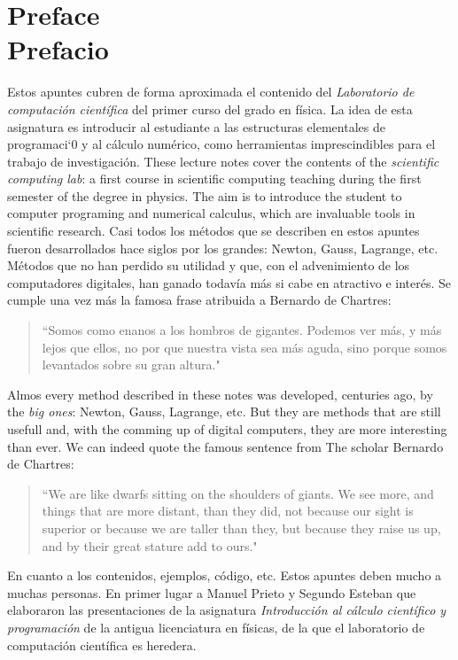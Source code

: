 \chapter*{Preface\\ Prefacio}
\begin{paracol}{2}
Estos apuntes cubren de forma aproximada  el contenido del \emph{Laboratorio de computación científica} del primer curso del grado en física.
La idea de esta asignatura es  introducir al estudiante a las estructuras elementales de programaci`0 y al cálculo numérico, como herramientas imprescindibles para el trabajo de investigación.
\switchcolumn
These lecture notes cover the contents  of the \emph{scientific computing lab}: a first course in scientific computing teaching during the first semester of the degree in physics. The aim is to introduce the student to computer programing and numerical calculus, which are invaluable tools in scientific research.
\switchcolumn         
Casi todos los métodos que se describen en estos apuntes fueron desarrollados hace siglos por los grandes: Newton, Gauss, Lagrange, etc.  Métodos que no han perdido su utilidad y que, con el advenimiento de los computadores digitales, han ganado todavía más si cabe en atractivo e interés. Se cumple una vez más la famosa frase atribuida a Bernardo de Chartres:
\begin{quote}
``Somos como enanos a los hombros de gigantes. Podemos ver más, y más lejos que ellos, no por que nuestra vista sea más aguda, sino porque somos levantados sobre su gran altura."
\end{quote}
\switchcolumn
Almos every method described in these notes was developed, centuries ago, by the \emph{big ones}: Newton, Gauss, Lagrange, etc. But they are methods that are still usefull and, with the comming up of digital computers, they are more interesting than ever. We can indeed quote the famous sentence from The scholar Bernardo de Chartres:
\begin{quote}
``We are like dwarfs sitting on the shoulders of giants. We see more, and things that are more distant, than they did, not because our sight is superior or because we are taller than they, but because they raise us up, and by their great stature add to ours."
\end{quote}          

\switchcolumn
En cuanto a los contenidos, ejemplos, código, etc. Estos apuntes deben mucho a muchas personas. En primer lugar a Manuel Prieto y Segundo Esteban que elaboraron las presentaciones de la asignatura \emph{Introducción al cálculo científico y programación} de la antigua licenciatura en físicas, de la que el laboratorio de computación científica es heredera. 


\end{paracol}
